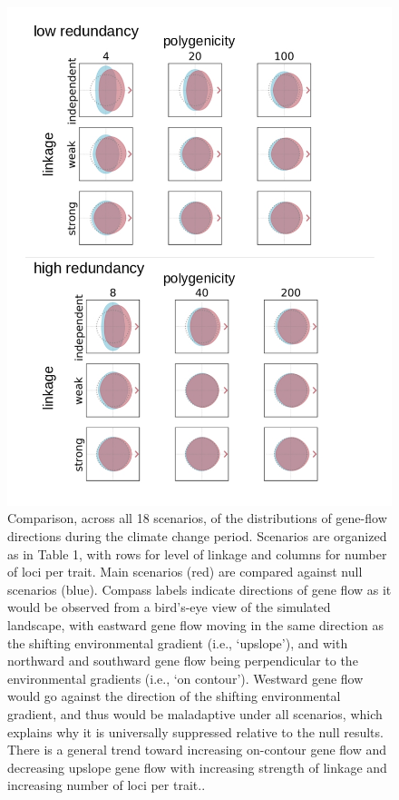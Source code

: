 \documentclass[9pt,twocolumn,twoside,lineno]{pnas-new}
\begin{document}
\begin{figure}
\centering
\includegraphics[width=.8\linewidth]{gene_flow_plots.jpg}
\caption{Comparison, across all 18 scenarios, of the distributions of gene-flow directions during the climate change period. Scenarios are organized as in Table 1, with rows for level of linkage and columns for number of loci per trait. Main scenarios (red) are compared against null scenarios (blue). Compass labels indicate directions of gene flow as it would be observed from a bird’s-eye view of the simulated landscape, with eastward gene flow moving in the same direction as the shifting environmental gradient (i.e., ‘upslope’), and with northward and southward gene flow being perpendicular to the environmental gradients (i.e., ‘on contour’). Westward gene flow would go against the direction of the shifting environmental gradient, and thus would be maladaptive under all scenarios, which explains why it is universally suppressed relative to the null results. There is a general trend toward increasing on-contour gene flow and decreasing upslope gene flow with increasing strength of linkage and increasing number of loci per trait..
}
\label{fig:gene_flow}
\end{figure}
\end{document}
